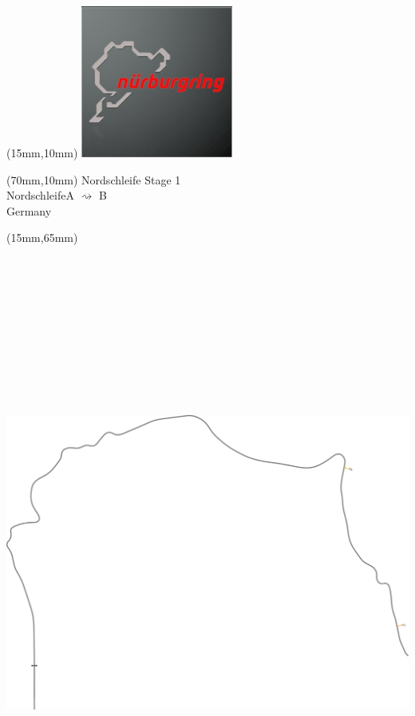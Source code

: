 \null\newpage
\begin{textblock*}{50mm}(15mm,10mm)%
\includegraphics[width=50mm]{LG/2015-05-20_00088.png}
\end{textblock*}
\begin{textblock*}{130mm}(70mm,10mm)%
{\fontsize{20}{20}\selectfont Nordschleife Stage 1\\}
{\fontsize{16}{16}\selectfont Nordschleife\hfill A $\rightsquigarrow$ B\\}
{\fontsize{12}{12}\selectfont Germany\\}
\end{textblock*}
\begin{textblock*}{185mm}(15mm,65mm)%
\centering
\mbox{\includegraphics[width=185mm,height=210mm,keepaspectratio]{PT/NOS1.pdf}}
\end{textblock*}
